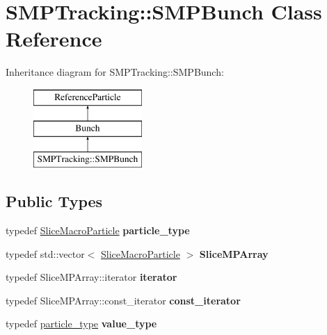 \hypertarget{classSMPTracking_1_1SMPBunch}{}\section{S\+M\+P\+Tracking\+:\+:S\+M\+P\+Bunch Class Reference}
\label{classSMPTracking_1_1SMPBunch}
Inheritance diagram for S\+M\+P\+Tracking\+:\+:S\+M\+P\+Bunch\+:\begin{figure}[H]
\begin{center}
\leavevmode
\includegraphics[height=3.000000cm]{classSMPTracking_1_1SMPBunch}
\end{center}
\end{figure}
\subsection*{Public Types}
\begin{DoxyCompactItemize}
\item 
\mbox{\label{classSMPTracking_1_1SMPBunch_acd83925dbd01de0b6bbd33ad5e5cae2c}} 
typedef \hyperlink{classSMPTracking_1_1SliceMacroParticle}{Slice\+Macro\+Particle} {\bfseries particle\+\_\+type}
\item 
\mbox{\label{classSMPTracking_1_1SMPBunch_a9eec160cf0fb9452b2ddd47c32bb7ea0}} 
typedef std\+::vector$<$ \hyperlink{classSMPTracking_1_1SliceMacroParticle}{Slice\+Macro\+Particle} $>$ {\bfseries Slice\+M\+P\+Array}
\item 
\mbox{\label{classSMPTracking_1_1SMPBunch_a8ac235d083bc784780af9fe8268de68f}} 
typedef Slice\+M\+P\+Array\+::iterator {\bfseries iterator}
\item 
\mbox{\label{classSMPTracking_1_1SMPBunch_a9619611b635f2e91e9b7f70798272d3e}} 
typedef Slice\+M\+P\+Array\+::const\+\_\+iterator {\bfseries const\+\_\+iterator}
\item 
\mbox{\label{classSMPTracking_1_1SMPBunch_a6d6b5fedb2d000476c62fed71dacb543}} 
typedef \hyperlink{classSMPTracking_1_1SliceMacroParticle}{particle\+\_\+type} {\bfseries value\+\_\+type}
\end{DoxyCompactItemize}
